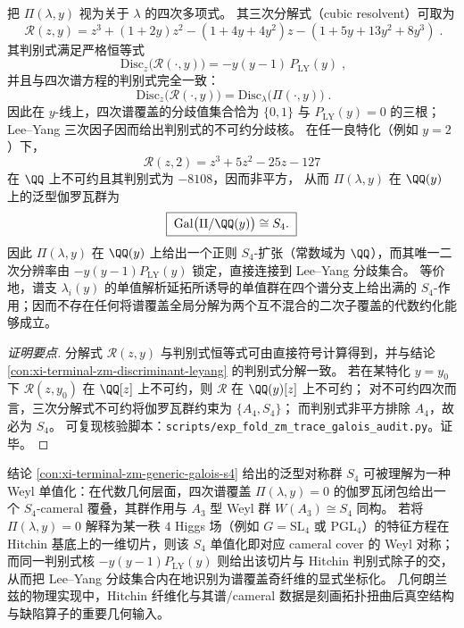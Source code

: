 \begin{conclusion}[谱的最大代数复杂度：\texorpdfstring{$\mathrm{Gal}_{\QQ(y)}\!\bigl(\Pi(\lambda,y)\bigr)\cong S_4$}{Gal(Q(y))(Pi)=S4}]\label{con:xi-terminal-zm-generic-galois-s4}
把 \(\Pi(\lambda,y)\) 视为关于 \(\lambda\) 的四次多项式。
其三次分解式（cubic resolvent）可取为
\[
\boxed{\;
\mathscr R(z,y)
=z^3+(1+2y)z^2-(1+4y+4y^2)z-(1+5y+13y^2+8y^3)\; }.
\]
其判别式满足严格恒等式
\[
\boxed{\;
\mathrm{Disc}_{z}\bigl(\mathscr R(\cdot,y)\bigr)
=-y(y-1)\,P_{\mathrm{LY}}(y)\; } ,
\]
并且与四次谱方程的判别式完全一致：
\[
\boxed{\;
\mathrm{Disc}_{z}\bigl(\mathscr R(\cdot,y)\bigr)
=\mathrm{Disc}_{\lambda}\bigl(\Pi(\cdot,y)\bigr)\; } .
\]
因此在 \(y\)-线上，四次谱覆盖的分歧值集合恰为 \(\{0,1\}\) 与 \(P_{\mathrm{LY}}(y)=0\) 的三根；Lee--Yang 三次因子因而给出判别式的不可约分歧核。
在任一良特化（例如 \(y=2\)）下，
\[
\mathscr R(z,2)=z^{3}+5z^{2}-25z-127
\]
在 \(\QQ\) 上不可约且其判别式为 \(-8108\)，因而非平方，
从而 \(\Pi(\lambda,y)\) 在 \(\QQ(y)\) 上的泛型伽罗瓦群为
\[
\boxed{\;\mathrm{Gal}\bigl(\Pi/\QQ(y)\bigr)\cong S_4.\;}
\]
因此 \(\Pi(\lambda,y)\) 在 \(\QQ(y)\) 上给出一个正则 \(S_4\)-扩张（常数域为 \(\QQ\)），而其唯一二次分辨率由 \(-y(y-1)P_{\mathrm{LY}}(y)\) 锁定，直接连接到 Lee--Yang 分歧集合。
等价地，谱支 \(\lambda_i(y)\) 的单值解析延拓所诱导的单值群在四个谱分支上给出满的 \(S_4\)-作用；因而不存在任何将谱覆盖全局分解为两个互不混合的二次子覆盖的代数约化能够成立。
\end{conclusion}
\begin{proof}[证明要点]
分解式 \(\mathscr R(z,y)\) 与判别式恒等式可由直接符号计算得到，并与结论 \ref{con:xi-terminal-zm-discriminant-leyang} 的判别式分解一致。
若在某特化 \(y=y_0\) 下 \(\mathscr R(z,y_0)\) 在 \(\QQ[z]\) 上不可约，则 \(\mathscr R\) 在 \(\QQ(y)[z]\) 上不可约；
对不可约四次而言，三次分解式不可约将伽罗瓦群约束为 \(\{A_4,S_4\}\)；
而判别式非平方排除 \(A_4\)，故必为 \(S_4\)。
可复现核验脚本：\texttt{scripts/exp\_fold\_zm\_trace\_galois\_audit.py}。证毕。
\end{proof}

\begin{remark}[Hitchin 谱覆盖与 \texorpdfstring{$A_3$}{A3} cameral 覆叠：\texorpdfstring{$S_4\simeq W(A_3)$}{S4=W(A3)} 的结构性解释]\label{rem:xi-terminal-zm-hitchin-cameral-cover}
结论 \ref{con:xi-terminal-zm-generic-galois-s4} 给出的泛型对称群 \(S_4\) 可被理解为一种 Weyl 单值化：在代数几何层面，四次谱覆盖 \(\Pi(\lambda,y)=0\) 的伽罗瓦闭包给出一个 \(S_4\)-cameral 覆叠，其群作用与 \(A_3\) 型 Weyl 群 \(W(A_3)\cong S_4\) 同构。
若将 \(\Pi(\lambda,y)=0\) 解释为某一秩 \(4\) Higgs 场（例如 \(G=\mathrm{SL}_4\) 或 \(\mathrm{PGL}_4\)）的特征方程在 Hitchin 基底上的一维切片，则该 \(S_4\) 单值化即对应 cameral cover 的 Weyl 对称；
而同一判别式核 \(-y(y-1)P_{\mathrm{LY}}(y)\) 则给出该切片与 Hitchin 判别式除子的交，从而把 Lee--Yang 分歧集合内在地识别为谱覆盖奇纤维的显式坐标化。
几何朗兰兹的物理实现中，Hitchin 纤维化与其谱/cameral 数据是刻画拓扑扭曲后真空结构与缺陷算子的重要几何输入。\cite{KapustinWitten2006GeometricLanglands}
\end{remark}

